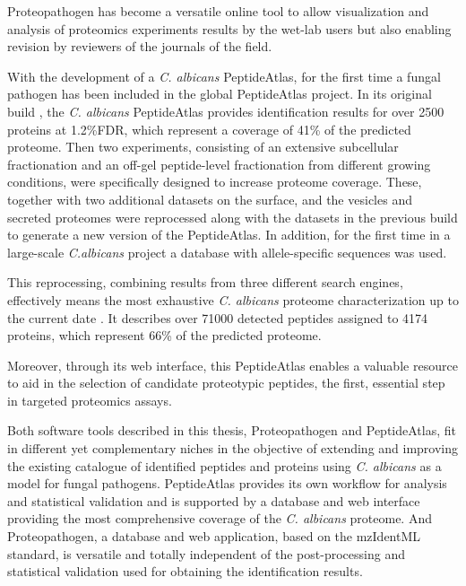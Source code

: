 Proteopathogen has become a versatile online tool to allow
visualization and analysis of proteomics experiments results by the wet-lab 
users but also enabling revision by reviewers of the journals of the field.

\medskip

With the development of a \textit{C. albicans} PeptideAtlas, for the
first time a fungal pathogen has been included in the global PeptideAtlas project.
In its original build \citep{Vialas2013}, the \textit{C. albicans} PeptideAtlas provides identification
results for over 2500 proteins at 1.2\%FDR, which represent a coverage of 41\% of
the predicted proteome. Then two 
experiments, consisting of an extensive subcellular fractionation and an off-gel
peptide-level fractionation from different growing conditions, were specifically
designed to increase proteome coverage. These, together with two additional datasets
on the surface, and the vesicles and secreted proteomes were reprocessed along with
the datasets in the previous build to generate a new version of the PeptideAtlas.
In addition, for the first time in a large-scale \textit{C.albicans} project
a database with allele-specific sequences was used. 

\medskip

This reprocessing, combining results from three different search engines,
effectively means the most exhaustive \textit{C. albicans}
proteome characterization up to the current date \citep{Vialas2015a}.
It describes over 71000 detected peptides assigned to 4174 proteins, which
represent 66\% of the predicted proteome. 

\medskip

Moreover, through its web interface, this PeptideAtlas enables a valuable
resource to aid in the selection of candidate proteotypic peptides, the
first, essential step in targeted proteomics assays.

\medskip

Both software tools described in this thesis, Proteopathogen and PeptideAtlas,
fit in different yet complementary niches in the objective of extending and improving
the existing catalogue of identified peptides and proteins using \textit{C. albicans} 
as a model for fungal pathogens. PeptideAtlas provides its own workflow for analysis
and statistical validation and is supported by a database and web interface providing
the most comprehensive coverage of the \textit{C. albicans} proteome. And Proteopathogen, a database 
and web application, based on the mzIdentML standard, is versatile and totally independent
of the post-processing and statistical validation used for obtaining the identification results.

